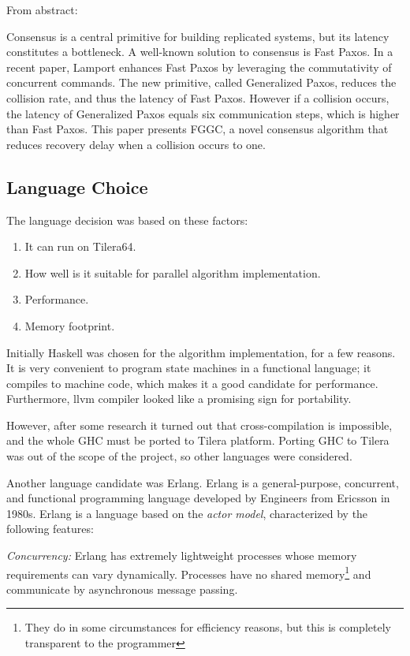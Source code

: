 \documentclass[english,11pt]{article}
\begin{document}
From abstract\cite{fggc}:

Consensus is a central primitive for building replicated systems, but its
latency constitutes a bottleneck. A well-known solution to consensus is Fast
Paxos. In a recent paper, Lamport enhances Fast Paxos by leveraging the
commutativity of concurrent commands. The new primitive, called Generalized
Paxos, reduces the collision rate, and thus the latency of Fast Paxos. However
if a collision occurs, the latency of Generalized Paxos equals six communication
steps, which is higher than Fast Paxos. This paper presents FGGC, a novel
consensus algorithm that reduces recovery delay when a collision occurs to one.

\subsection{Language Choice}
\label{sec:erlang-why}

The language decision was based on these factors:
\begin{enumerate}
    \item It can run on Tilera64.
    \item How well is it suitable for parallel algorithm implementation.
    \item Performance.
    \item Memory footprint.
\end{enumerate}

Initially Haskell was chosen for the algorithm implementation, for a few
reasons. It is very convenient to program state machines in a functional
language; it compiles to machine code, which makes it a good candidate for
performance. Furthermore, llvm compiler looked like a promising sign for
portability.

However, after some research it turned out that cross-compilation is impossible,
and the whole GHC must be ported to Tilera platform. Porting GHC to Tilera was
out of the scope of the project, so other languages were considered.

Another language candidate was Erlang. Erlang is a general-purpose, concurrent,
and functional programming language developed by Engineers from Ericsson in
1980s. Erlang is a language based on the  {\em actor model}, characterized by
the following features:

{\em Concurrency:} Erlang has extremely lightweight processes whose memory
requirements can vary dynamically. Processes have no shared
memory\footnote{They do in some circumstances for efficiency reasons, but this
is completely transparent to the programmer} and communicate by asynchronous
message passing.
\end{document}
